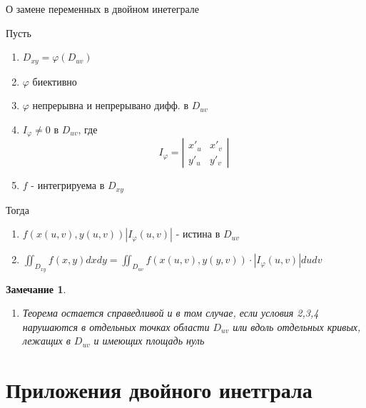 \documentclass[a4paper, 14pt]{report}
\newtheorem{note}{Замечание}[chapter]
\begin{document}
\begin{theorem}
    О замене переменных в двойном инетеграле

    Пусть

    \begin{enumerate}
        \item $D_{xy} = \varphi(D_{uv})$
        \item $\varphi$ биективно
        \item $\varphi$ непрерывна и непрерывано дифф. в $D_{uv}$
        \item $I_\varphi \ne 0$ в $D_{uv}$, где 
            $$
                I_\varphi = \left| \begin{matrix} x'_u & x'_v \\ y'_u & y'_v \end{matrix} \right|
            $$
        \item $f$ - интегрируема в $D_{xy}$
    \end{enumerate}
    
    Тогда

    \begin{enumerate}
        \item $f(x(u,v), y(u,v)) |I_\varphi (u,v)|$ - истина в $D_{uv}$
        \item $\iint_{D_{xy}} f(x,y) dxdy = \iint_{D_{uv}} f(x(u,v), y(y,v)) \cdot |I_\varphi (u,v)| dudv$
    \end{enumerate}
\end{theorem}

\begin{note}
    \begin{enumerate}
        \item Теорема остается справедливой и в том случае, если условия 2,3,4 нарушаются в отдельных точках области $D_{uv}$ или вдоль отдельных кривых, лежащих в $D_{uv}$ и имеющих площадь нуль
    \end{enumerate}
\end{note}

\section{Приложения двойного инетграла}
\end{document}
